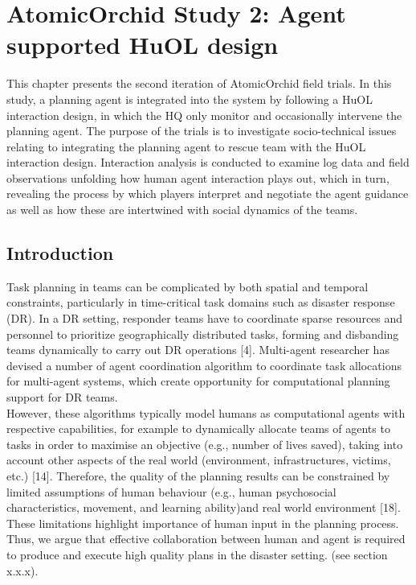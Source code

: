 \chapter{AtomicOrchid Study 2: Agent supported HuOL design}\label{ch:mathtest} %
This chapter presents the second iteration of AtomicOrchid field trials. In this study, a planning agent is integrated into the system by following a HuOL interaction design, in which the HQ only monitor and occasionally intervene the planning agent. The purpose of the trials is to investigate socio-technical issues relating to integrating the planning agent to rescue team with the HuOL interaction design. Interaction analysis is conducted to examine log data and field observations unfolding how human agent interaction plays out, which in turn, revealing the process by which players interpret and negotiate the agent guidance as well as how these are intertwined with social dynamics of the teams.

\section{Introduction}
Task planning in teams can be complicated by both spatial and temporal constraints, particularly in time-critical task domains such as disaster response (DR). In a DR setting, responder teams have to coordinate sparse resources and personnel to prioritize geographically distributed tasks, forming and disbanding teams dynamically to carry out DR operations [4]. Multi-agent researcher has devised a number of agent coordination algorithm to coordinate task allocations for multi-agent systems, which create opportunity for computational planning support for DR teams. \\

However, these algorithms typically model humans as computational agents with respective capabilities, for example to dynamically allocate teams of agents to tasks in order to maximise an objective (e.g., number of lives saved), taking into account other aspects of the real world (environment, infrastructures, victims, etc.) [14]. Therefore, the quality of the planning results can be constrained by limited assumptions of human behaviour (e.g., human psychosocial characteristics, movement, and learning ability)and real world environment [18]. These limitations highlight importance of human input in the planning process. Thus, we argue that effective collaboration between human and agent is required to produce and execute high quality plans in the disaster setting. (see section x.x.x). \\

